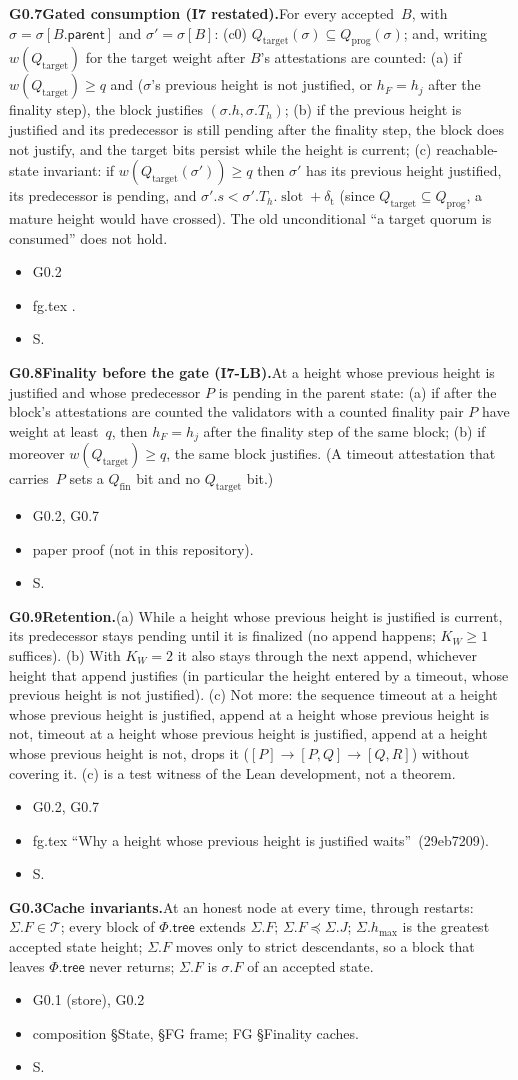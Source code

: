 \documentclass{article}
\newcommand{\slot}{\operatorname{slot}}
\newcommand{\parent}{\mathsf{parent}}
\newcommand{\T}{\mathcal T}
\newcommand{\hmax}{h_{\max}}
\newcommand{\Fr}{\Phi}
\newcommand{\fname}[1]{\text{\textsc{#1}}}
\newcommand{\Qtarget}{Q_{\mathrm{target}}}
\newcommand{\Qprog}{Q_{\mathrm{prog}}}
\newcommand{\Qfin}{Q_{\mathrm{fin}}}
\newcommand{\dagnode}[6]{%
\par\medskip\noindent\textbf{#1\enspace #2.}\enspace #3
\begin{itemize}[leftmargin=2.2em,itemsep=0pt,topsep=2pt]
\item[\emph{Uses}] #4
\item[\emph{Evid.}] #5
\item[\emph{Task}] #6
\end{itemize}}
\begin{document}
\dagnode{G0.7}{Gated consumption (I7 restated)}{For every accepted~$B$,
with $\sigma=\sigma[B.\parent]$ and $\sigma'=\sigma[B]$: (c0)
$\Qtarget(\sigma)\subseteq\Qprog(\sigma)$; and, writing $w(\Qtarget)$ for the
target weight after $B$'s attestations are counted:
(a) if $w(\Qtarget)\geq q$ and ($\sigma$'s previous height is not justified, or $h_F=h_j$
after the finality step), the block justifies $(\sigma.h,\sigma.T_h)$;
(b) if the previous height is justified and its predecessor is still pending after the
finality step, the block does not justify, and the target bits persist while
the height is current;
(c) reachable-state invariant: if $w(\Qtarget(\sigma'))\geq q$ then
$\sigma'$ has its previous height justified, its predecessor is pending, and
$\sigma'.s<\sigma'.T_h.\slot+\delta_{\mathrm t}$ (since
$\Qtarget\subseteq\Qprog$, a mature height would have crossed).  The old
unconditional ``a target quorum is consumed'' does not hold.}
{G0.2}{fg.tex \fname{process\_height\_events}.}{S.}

\dagnode{G0.8}{Finality before the gate (I7-LB)}{At a height whose previous height is justified and whose
predecessor $P$ is pending in the parent state: (a) if after the block's
attestations are counted the validators with a counted finality pair $P$
have weight at least~$q$, then $h_F=h_j$ after the finality step of the same
block; (b) if moreover $w(\Qtarget)\geq q$, the same block justifies.  (A
timeout attestation that carries~$P$ sets a $\Qfin$ bit and no $\Qtarget$ bit.)}
{G0.2, G0.7}{paper proof (not in this repository).}{S.}

\dagnode{G0.9}{Retention}{(a) While a height whose previous height is justified is current, its
predecessor stays pending until it is finalized (no append happens; $K_W\geq1$
suffices).  (b) With $K_W=2$ it also stays through the next append, whichever
height that append justifies (in particular the height entered by a
timeout, whose previous height is not justified).  (c) Not more: the
sequence timeout at a height whose previous height is justified, append at a
height whose previous height is not, timeout at a height whose previous
height is justified, append at a height whose previous height is not, drops
it ($[P]\to[P,Q]\to[Q,R]$) without covering it.  (c) is a test witness of the
Lean development, not a theorem.}
{G0.2, G0.7}{fg.tex ``Why a height whose previous height is justified waits''~(29eb7209).}{S.}

\dagnode{G0.3}{Cache invariants}{At an honest node at every time, through
restarts: $\Sigma.F\in\T$; every block of $\Fr.\mathsf{tree}$ extends
$\Sigma.F$; $\Sigma.F\preceq\Sigma.J$; $\Sigma.\hmax$ is the greatest
accepted state height; $\Sigma.F$ moves only to strict descendants, so a block
that leaves $\Fr.\mathsf{tree}$ never returns; $\Sigma.F$ is $\sigma.F$ of an
accepted state.}
{G0.1 (store), G0.2}{composition \S State, \S FG frame; FG \S Finality caches.}{S.}
\end{document}
